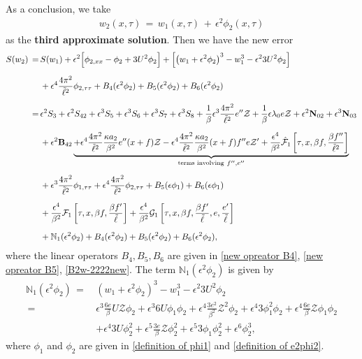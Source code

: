 \documentclass[10pt, reqno]{amsart}
\numberwithin{equation}{section}
\theoremstyle{definition}
\begin{document}
{{\medskip\medskip
As a conclusion, we take
\begin{align}\label{newthirdapproximatesolution}
w_2(x, \tau) \,=\, w_1(x, \tau)\,+\,\epsilon^2 \phi_2(x, \tau)
\end{align}
as the {\bf{third approximate solution}}.
Then we have the new error
\begin{align}\label{sw2new}
S (w_2)
\,=\,
&S(w_1)
+
\epsilon^2\Big[ \phi_{2, xx} - \phi_2 + 3 U^2 \phi_2 \Big]
+
\left[ \left( w_1+ \epsilon^2\phi_2\right)^3 -w_1^3- \epsilon^2 3U^2\phi_2 \right]
\nonumber\\[2mm]
& + \epsilon^4\frac{4\pi^2}{{\tilde\ell}^2}\phi_{2, \tau\tau}
+ B_4(\epsilon^2\phi_2)+ B_5(\epsilon^2\phi_2)+ B_6(\epsilon^2\phi_2)
\nonumber\\[2mm]
\,=\,&
\epsilon^2 S_{3} + \epsilon^2 S_{42} + \epsilon^3 S_{5} +\epsilon^3 S_{6}
 +\epsilon^3 S_{7} +\epsilon^3 S_{8}
 +\frac 1\beta\epsilon^3\frac{4\pi^2}{{\tilde\ell}^2} e''\mathcal Z
 +\frac 1\beta \epsilon\lambda_0 e{\mathcal Z}
 +\epsilon^2 {\bf N}_{02}
 +\epsilon^3{\bf N}_{03}
\nonumber\\[2mm]
& + \epsilon^2 {\bf B}_{42}
 \underbrace{ +\epsilon^4 \frac{4\pi^2} {{\tilde\ell}^2} \frac{\kappa a_2}{\, \beta^2\, } e'' (x+f)\mathcal Z
 -\epsilon^4  \frac{ 4\pi^2} {{\tilde\ell}^2} \frac{\kappa a_2}{\, \beta^2\, } (x+f) f'' e \mathcal Z' + \frac{\epsilon^4}{\beta^2} \hat{\mathcal F}_1\left[\tau, x, \beta f, \frac{\beta f''}{\tilde\ell^2} \right] }_{\text{terms involving}~f'', e''}
\nonumber\\[2mm]
&
 + \epsilon^3 \frac{4\pi^2}{{\tilde\ell}^2} {\phi}_{1, \tau\tau}
+ \epsilon^4 \frac{4\pi^2}{{\tilde\ell}^2}\phi_{2, \tau\tau}
+B_{5}(\epsilon\phi_1)+B_{6}(\epsilon\phi_1)
\nonumber\\[2mm]
&
 + \frac{\epsilon^4}{\beta^2} \mathcal F_1\left[\tau, x, \beta f, \frac{\beta f'}{\tilde\ell}\right]
 +\frac{\epsilon^4} {\beta^2} \mathcal G_1\left[\tau, x, \beta f, \frac{\beta f'}{\tilde\ell}, e, \frac{e'}{\tilde\ell}\right]
\nonumber\\[2mm]
&+ \mathbb{N}_1 (\epsilon^2 \phi_2)
+ B_4(\epsilon^2\phi_2)+ B_5 (\epsilon^2{\phi_2})+ B_6 (\epsilon^2{\phi_2}),
\end{align}
where the linear operators $ B_4, B_5, B_6 $ are given in \eqref{new opreator B4}, \eqref{new opreator B5}, \eqref{B2w-2222new}.
The term $\mathbb{N}_1 (\epsilon^2 \phi_2)$ is given by
\begin{align}
\mathbb{N}_1 (\epsilon^2\phi_2)
\,=\, & \left( w_1+ \epsilon^2\phi_2\right)^3 -w_1^3 - \epsilon^2 3 U^2 \phi_2
\nonumber\\[2mm]
\,=\,&\epsilon^3 \frac{6e}{\beta}U{\mathcal Z}\phi_2 + \epsilon^3 6 U\phi_1\phi_2
+\epsilon^4 \frac{3e^2}{\beta^2}{\mathcal Z}^2\phi_2 +\epsilon^4 3\phi_1^2\phi_2
+\epsilon^4 \frac{6e}{\beta}{\mathcal Z}\phi_1\phi_2
\nonumber\\[2mm]
&+ \epsilon^4 3U \phi_2^2
+\epsilon^5 \frac{3e}{\beta}{\mathcal Z}\phi_2^2 + \epsilon^5 3\phi_1 \phi_2^2
+\epsilon^6 \phi_2^3,
\label{definition of mathbbN1}
\end{align}
where $\phi_1$ and $\phi_2$ are given in \eqref{definition of phi1} and \eqref{definition of e2phi2}.

}}
\end{document}

